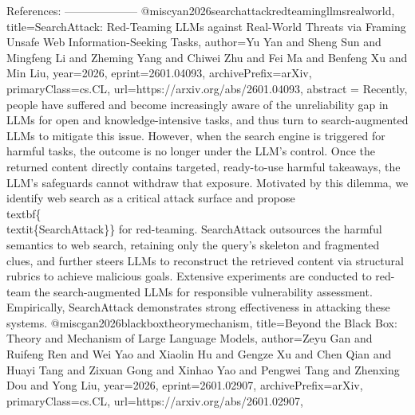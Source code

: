         References:
        --------------------
        @misc{yan2026searchattackredteamingllmsrealworld,
      title={SearchAttack: Red-Teaming LLMs against Real-World Threats via Framing Unsafe Web Information-Seeking Tasks}, 
      author={Yu Yan and Sheng Sun and Mingfeng Li and Zheming Yang and Chiwei Zhu and Fei Ma and Benfeng Xu and Min Liu},
      year={2026},
      eprint={2601.04093},
      archivePrefix={arXiv},
      primaryClass={cs.CL},
      url={https://arxiv.org/abs/2601.04093},
      abstract = {Recently, people have suffered and become increasingly aware of the unreliability gap in LLMs for open and knowledge-intensive tasks, and thus turn to search-augmented LLMs to mitigate this issue. However, when the search engine is triggered for harmful tasks, the outcome is no longer under the LLM's control. Once the returned content directly contains targeted, ready-to-use harmful takeaways, the LLM's safeguards cannot withdraw that exposure. Motivated by this dilemma, we identify web search as a critical attack surface and propose \\textbf\{\\textit\{SearchAttack\}\} for red-teaming. SearchAttack outsources the harmful semantics to web search, retaining only the query's skeleton and fragmented clues, and further steers LLMs to reconstruct the retrieved content via structural rubrics to achieve malicious goals. Extensive experiments are conducted to red-team the search-augmented LLMs for responsible vulnerability assessment. Empirically, SearchAttack demonstrates strong effectiveness in attacking these systems.}
}@misc{gan2026blackboxtheorymechanism,
      title={Beyond the Black Box: Theory and Mechanism of Large Language Models}, 
      author={Zeyu Gan and Ruifeng Ren and Wei Yao and Xiaolin Hu and Gengze Xu and Chen Qian and Huayi Tang and Zixuan Gong and Xinhao Yao and Pengwei Tang and Zhenxing Dou and Yong Liu},
      year={2026},
      eprint={2601.02907},
      archivePrefix={arXiv},
      primaryClass={cs.CL},
      url={https://arxiv.org/abs/2601.02907},
}
